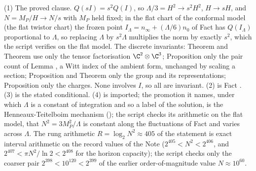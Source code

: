 (1) The proved clause. $Q(sI) = s^{2}Q(I)$, so $\Lambda/3 = H^{2} \to s^{2}H^{2}$, $H \to sH$, and $N = M_{P}/H \to N/s$ with $M_{P}$ held fixed; in the flat chart of the conformal model (the flat twistor chart) the frozen point $I_{\Lambda} = n_{\infty} + (\Lambda/6)n_{0}$ of Fact  has $Q(I_{\Lambda})$ proportional to $\Lambda$, so replacing $\Lambda$ by $s^{2}\Lambda$ multiplies the norm by exactly $s^{2}$, which the script verifies on the flat model. The discrete invariants: Theorem  and Theorem  use only the tensor factorisation $\C^{2} \otimes \C^{3}$; Proposition  only the pair count of Lemma , a Witt index of the ambient form, unchanged by scaling a section; Proposition  and Theorem  only the group and its representations; Proposition  only the charges. None involves $I$, so all are invariant. (2) is Fact . (3) is the stated conditional. (4) is imported; the promotion it names, under which $\Lambda$ is a constant of integration and so a label of the solution, is the Henneaux-Teitelboim mechanism (); the script checks its arithmetic on the flat model, that $N^{2} = 3M_{P}^{2}/\Lambda$ is constant along the fluctuations of Fact  and varies across $\Lambda$. The rung arithmetic $R = \log_{2}N^{2} \approx 405$ of the statement is exact interval arithmetic on the record values of the Note ($2^{405} < N^{2} < 2^{406}$, and $2^{407} < \pi N^{2}/\ln 2 < 2^{408}$ for the horizon capacity); the script checks only the coarser pair $2^{398} < 10^{120} < 2^{399}$ of the earlier order-of-magnitude value $N \approx 10^{60}$.
